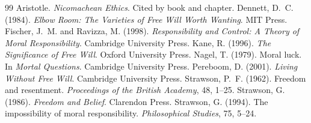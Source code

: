 \documentclass{situationist-preprint}
\begin{document}
\begin{thebibliography}{99}\small
{} Aristotle. \emph{Nicomachean Ethics}. Cited by book and chapter.
 Dennett, D.~C. (1984). \emph{Elbow Room: The Varieties of Free Will Worth Wanting}. MIT Press.
 Fischer, J.~M. and Ravizza, M. (1998). \emph{Responsibility and Control: A Theory of Moral Responsibility}. Cambridge University Press.
 Kane, R. (1996). \emph{The Significance of Free Will}. Oxford University Press.
 Nagel, T. (1979). Moral luck. In \emph{Mortal Questions}. Cambridge University Press.
 Pereboom, D. (2001). \emph{Living Without Free Will}. Cambridge University Press.
 Strawson, P.~F. (1962). Freedom and resentment. \emph{Proceedings of the British Academy}, 48, 1--25.
 Strawson, G. (1986). \emph{Freedom and Belief}. Clarendon Press.
 Strawson, G. (1994). The impossibility of moral responsibility. \emph{Philosophical Studies}, 75, 5--24.
\end{thebibliography}
\end{document}
